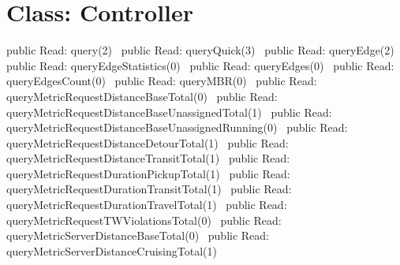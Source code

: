 \section*{Class: Controller}
\nwenddocs{}\endmoddef{}
public \LA{}Read: query(2)~{\nwtagstyle{}}\RA{}
public \LA{}Read: queryQuick(3)~{\nwtagstyle{}}\RA{}
public \LA{}Read: queryEdge(2)~{\nwtagstyle{}}\RA{}
public \LA{}Read: queryEdgeStatistics(0)~{\nwtagstyle{}}\RA{}
public \LA{}Read: queryEdges(0)~{\nwtagstyle{}}\RA{}
public \LA{}Read: queryEdgesCount(0)~{\nwtagstyle{}}\RA{}
public \LA{}Read: queryMBR(0)~{\nwtagstyle{}}\RA{}
public \LA{}Read: queryMetricRequestDistanceBaseTotal(0)~{\nwtagstyle{}}\RA{}
public \LA{}Read: queryMetricRequestDistanceBaseUnassignedTotal(1)~{\nwtagstyle{}}\RA{}
public \LA{}Read: queryMetricRequestDistanceBaseUnassignedRunning(0)~{\nwtagstyle{}}\RA{}
public \LA{}Read: queryMetricRequestDistanceDetourTotal(1)~{\nwtagstyle{}}\RA{}
public \LA{}Read: queryMetricRequestDistanceTransitTotal(1)~{\nwtagstyle{}}\RA{}
public \LA{}Read: queryMetricRequestDurationPickupTotal(1)~{\nwtagstyle{}}\RA{}
public \LA{}Read: queryMetricRequestDurationTransitTotal(1)~{\nwtagstyle{}}\RA{}
public \LA{}Read: queryMetricRequestDurationTravelTotal(1)~{\nwtagstyle{}}\RA{}
public \LA{}Read: queryMetricRequestTWViolationsTotal(0)~{\nwtagstyle{}}\RA{}
public \LA{}Read: queryMetricServerDistanceBaseTotal(0)~{\nwtagstyle{}}\RA{}
public \LA{}Read: queryMetricServerDistanceCruisingTotal(1)~{\nwtagstyle{}}\RA{}
